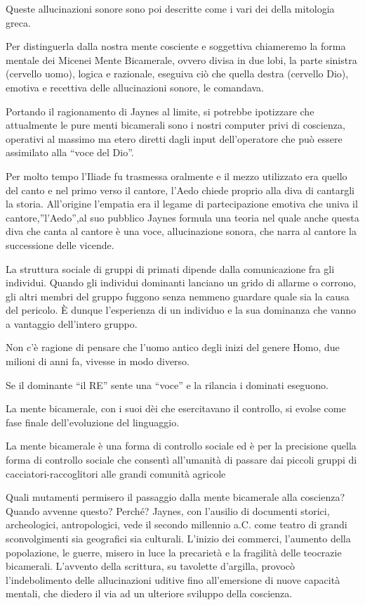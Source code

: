 Queste allucinazioni sonore sono poi descritte come i vari dei della mitologia
greca.

Per distinguerla dalla nostra mente cosciente e soggettiva chiameremo la forma
mentale dei Micenei Mente Bicamerale, ovvero divisa in due lobi, la parte sinistra
(cervello uomo), logica e razionale, eseguiva ciò che quella destra (cervello Dio),
emotiva e recettiva delle allucinazioni sonore, le comandava.

Portando il ragionamento di Jaynes al limite, si potrebbe ipotizzare che
attualmente le pure menti bicamerali sono i nostri computer privi di coscienza,
operativi al massimo ma etero diretti dagli input dell’operatore che può essere
assimilato alla “voce del Dio”.

Per molto tempo l’Iliade fu trasmessa oralmente e il mezzo utilizzato era quello
del canto e nel primo verso il cantore, l’Aedo  chiede proprio alla diva di
cantargli la storia.  All’origine l’empatia era il legame di partecipazione
emotiva che univa il cantore,”l’Aedo”,al suo pubblico Jaynes formula una teoria
nel quale anche questa diva che canta al cantore è una voce, allucinazione
sonora, che narra al cantore la successione delle vicende.

La struttura sociale di gruppi di primati dipende dalla comunicazione fra gli
individui. Quando gli individui dominanti lanciano un grido di allarme o corrono,
gli altri membri del gruppo fuggono senza nemmeno guardare quale sia la causa
del pericolo. È dunque l'esperienza di un individuo e la sua dominanza che vanno
a vantaggio dell'intero gruppo.

Non c'è ragione di pensare che l'uomo antico degli inizi del genere Homo, due
milioni di anni fa, vivesse in modo diverso.

Se il dominante  “il RE” sente una “voce”  e la rilancia  i dominati eseguono.

La mente bicamerale, con i suoi dèi che esercitavano il controllo, si evolse
come fase finale dell'evoluzione del linguaggio.

La mente bicamerale è una forma di controllo sociale ed è per la precisione
quella forma di controllo sociale che consentì all’umanità di passare dai
piccoli gruppi di cacciatori-raccoglitori alle grandi comunità agricole

Quali mutamenti permisero il passaggio dalla mente bicamerale alla coscienza?
Quando avvenne questo? Perché? Jaynes, con l’ausilio di documenti storici,
archeologici, antropologici, vede il secondo millennio a.C. come teatro di
grandi sconvolgimenti sia geografici sia culturali. L’inizio dei commerci,
l’aumento della popolazione, le guerre, misero in luce la precarietà e la
fragilità delle teocrazie bicamerali. L’avvento della scrittura, su tavolette
d’argilla, provocò l’indebolimento delle allucinazioni uditive fino all’emersione
di nuove capacità mentali, che diedero il via ad un ulteriore sviluppo della
coscienza.

